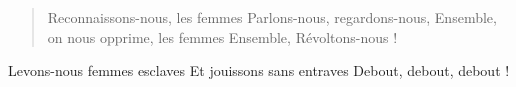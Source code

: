 \documentclass{article}
\begin{document}
\begin{songs}{}
\begin{verse}
Reconnaissons-nous, les femmes
Parlons-nous, regardons-nous,
Ensemble, on nous opprime, les femmes
Ensemble, Révoltons-nous !
\end{verse}

\begin{chorus}
    \begin{bis}
    Levons-nous femmes esclaves
    Et jouissons sans entraves
    Debout, debout, debout !
    \end{bis}
\end{chorus}




\endsong
\end{songs}
\end{document}

